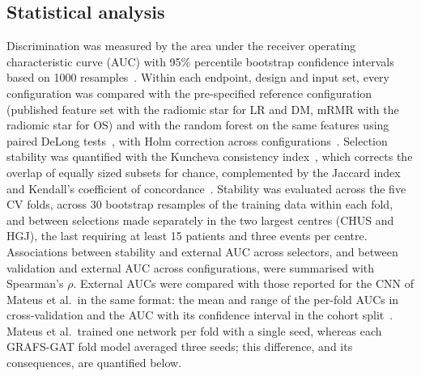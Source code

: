 \documentclass[11pt,a4paper]{article}
\newcommand{\method}{GRAFS-GAT}
\begin{document}
\subsection{Statistical analysis}
Discrimination was measured by the area under the receiver operating characteristic curve (AUC) with 95\% percentile bootstrap confidence intervals based on 1000 resamples~\cite{efron1993}. Within each endpoint, design and input set, every configuration was compared with the pre-specified reference configuration (published feature set with the radiomic star for LR and DM, mRMR with the radiomic star for OS) and with the random forest on the same features using paired DeLong tests~\cite{delong1988}, with Holm correction across configurations~\cite{holm1979}. Selection stability was quantified with the Kuncheva consistency index~\cite{kuncheva2007}, which corrects the overlap of equally sized subsets for chance, complemented by the Jaccard index and Kendall's coefficient of concordance~\cite{kendall1939}. Stability was evaluated across the five CV folds, across 30 bootstrap resamples of the training data within each fold, and between selections made separately in the two largest centres (CHUS and HGJ), the last requiring at least 15 patients and three events per centre. Associations between stability and external AUC across selectors, and between validation and external AUC across configurations, were summarised with Spearman's $\rho$. External AUCs were compared with those reported for the CNN of Mateus et al.\ in the same format: the mean and range of the per-fold AUCs in cross-validation and the AUC with its confidence interval in the cohort split~\cite{mateus2023}. Mateus et al.\ trained one network per fold with a single seed, whereas each \method{} fold model averaged three seeds; this difference, and its consequences, are quantified below.
\end{document}
